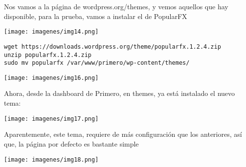 \documentclass{article}
\begin{document}
Nos vamos a la página de wordpress.org/themes, y vemos aquellos que hay disponible, para la prueba, vamos a instalar el de PopularFX

\begin{center}
\texttt{[image: imagenes/img14.png]} 
\end{center}

\begin{lstlisting}[frame=single] 
wget https://downloads.wordpress.org/theme/popularfx.1.2.4.zip
unzip popularfx.1.2.4.zip 
sudo mv popularfx /var/www/primero/wp-content/themes/

\end{lstlisting}
\begin{center}
\texttt{[image: imagenes/img16.png]} 
\end{center}

\begin{flushleft}
Ahora, desde la dashboard de Primero, en themes, ya está instalado el nuevo tema:

\end{flushleft}
\begin{center}
\texttt{[image: imagenes/img17.png]} 
\end{center}

\begin{flushleft}
Aparentemente, este tema, requiere de más configuración que los anteriores, así que, la página por defecto es bastante simple
\end{flushleft}

\begin{center}
\texttt{[image: imagenes/img18.png]} 
\end{center}

 
 
\end{document}

